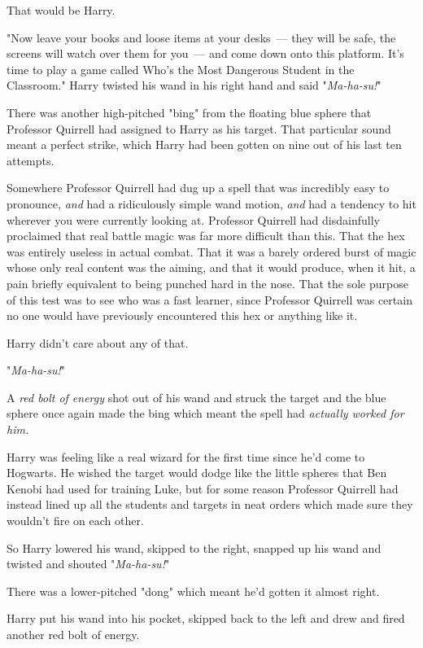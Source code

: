 That would be Harry.

"Now leave your books and loose items at your desks~--- they will be safe, the
screens will watch over them for you~--- and come down onto this platform. It's
time to play a game called Who's the Most Dangerous Student in the Classroom."
\sbreak
Harry twisted his wand in his right hand and said "\emph{Ma-ha-su!}"

There was another high-pitched "bing" from the floating blue sphere that
Professor Quirrell had assigned to Harry as his target. That particular sound
meant a perfect strike, which Harry had been gotten on nine out of his last ten
attempts.

Somewhere Professor Quirrell had dug up a spell that was incredibly easy to
pronounce, \emph{and} had a ridiculously simple wand motion, \emph{and} had a
tendency to hit wherever you were currently looking at. Professor Quirrell had
disdainfully proclaimed that real battle magic was far more difficult than
this. That the hex was entirely useless in actual combat. That it was a barely
ordered burst of magic whose only real content was the aiming, and that it
would produce, when it hit, a pain briefly equivalent to being punched hard in
the nose. That the sole purpose of this test was to see who was a fast learner,
since Professor Quirrell was certain no one would have previously encountered
this hex or anything like it.

Harry didn't care about any of that.

"\emph{Ma-ha-su!}"

A \emph{red bolt of energy} shot out of his wand and struck the target and the
blue sphere once again made the bing which meant the spell had \emph{actually
worked for him.}

Harry was feeling like a real wizard for the first time since he'd come to
Hogwarts. He wished the target would dodge like the little spheres that Ben
Kenobi had used for training Luke, but for some reason Professor Quirrell had
instead lined up all the students and targets in neat orders which made sure
they wouldn't fire on each other.

So Harry lowered his wand, skipped to the right, snapped up his wand and
twisted and shouted "\emph{Ma-ha-su!}"

There was a lower-pitched "dong" which meant he'd gotten it almost right.

Harry put his wand into his pocket, skipped back to the left and drew and fired
another red bolt of energy.

